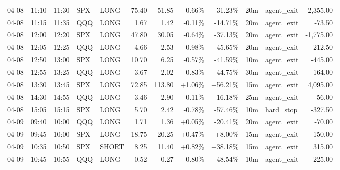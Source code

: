 \documentclass[11pt,a4paper]{article}
\begin{document}
\begin{center}
\begin{longtable}{>{\color{txtmain}}l l l l l r r r r r >{\color{txtmain}}l r}
04-08 & 11:10 & 11:30 & SPX & LONG & 75.40 & 51.85 & \textcolor{lossred}{-0.66\%} & \textcolor{lossred}{-31.23\%} & 20m & agent\_exit & \textcolor{lossred}{-2,355.00} \\
04-08 & 11:15 & 11:35 & QQQ & LONG & 1.67 & 1.42 & \textcolor{lossred}{-0.11\%} & \textcolor{lossred}{-14.71\%} & 20m & agent\_exit & \textcolor{lossred}{-73.50} \\
04-08 & 12:00 & 12:20 & SPX & LONG & 47.80 & 30.05 & \textcolor{lossred}{-0.64\%} & \textcolor{lossred}{-37.13\%} & 20m & agent\_exit & \textcolor{lossred}{-1,775.00} \\
04-08 & 12:05 & 12:25 & QQQ & LONG & 4.66 & 2.53 & \textcolor{lossred}{-0.98\%} & \textcolor{lossred}{-45.65\%} & 20m & agent\_exit & \textcolor{lossred}{-212.50} \\
04-08 & 12:50 & 13:00 & SPX & LONG & 10.70 & 6.25 & \textcolor{lossred}{-0.57\%} & \textcolor{lossred}{-41.59\%} & 10m & agent\_exit & \textcolor{lossred}{-445.00} \\
04-08 & 12:55 & 13:25 & QQQ & LONG & 3.67 & 2.02 & \textcolor{lossred}{-0.83\%} & \textcolor{lossred}{-44.75\%} & 30m & agent\_exit & \textcolor{lossred}{-164.00} \\
04-08 & 13:30 & 13:45 & SPX & LONG & 72.85 & 113.80 & \textcolor{wingreen}{+1.06\%} & \textcolor{wingreen}{+56.21\%} & 15m & agent\_exit & \textcolor{wingreen}{4,095.00} \\
04-08 & 14:30 & 14:55 & QQQ & LONG & 3.46 & 2.90 & \textcolor{lossred}{-0.11\%} & \textcolor{lossred}{-16.18\%} & 25m & agent\_exit & \textcolor{lossred}{-56.00} \\
04-08 & 15:05 & 15:15 & SPX & LONG & 5.70 & 2.42 & \textcolor{lossred}{-0.78\%} & \textcolor{lossred}{-57.46\%} & 10m & hard\_stop & \textcolor{lossred}{-327.50} \\
04-09 & 09:40 & 10:00 & QQQ & LONG & 1.71 & 1.36 & \textcolor{wingreen}{+0.05\%} & \textcolor{lossred}{-20.41\%} & 20m & agent\_exit & \textcolor{lossred}{-70.00} \\
04-09 & 09:45 & 10:00 & SPX & LONG & 18.75 & 20.25 & \textcolor{wingreen}{+0.47\%} & \textcolor{wingreen}{+8.00\%} & 15m & agent\_exit & \textcolor{wingreen}{150.00} \\
04-09 & 10:35 & 10:50 & SPX & SHORT & 8.25 & 11.40 & \textcolor{wingreen}{+0.82\%} & \textcolor{wingreen}{+38.18\%} & 15m & agent\_exit & \textcolor{wingreen}{315.00} \\
04-09 & 10:45 & 10:55 & QQQ & LONG & 0.52 & 0.27 & \textcolor{lossred}{-0.80\%} & \textcolor{lossred}{-48.54\%} & 10m & agent\_exit & \textcolor{lossred}{-225.00} \\

\end{longtable}
\end{center}
\end{document}
